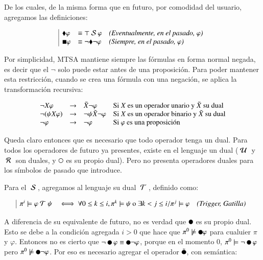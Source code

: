 De los cuales, de la misma forma que en futuro, por comodidad del usuario, agregamos las definiciones:

\[
	\begin{array}{|l l l}
		\blacklozenge \varphi & \equiv \top \text{ }\mathcal{S}\text{ } \varphi & \textit{(Eventualmente, en el pasado, $\varphi$)} \\
		\blacksquare \varphi & \equiv \neg \blacklozenge \neg \varphi & \textit{(Siempre, en el pasado, $\varphi$)} \\
	\end{array}
\]

Por simplicidad, MTSA mantiene siempre las fórmulas en forma normal negada, es decir que el $\neg$ solo puede estar antes de una proposición. Para poder mantener esta restricción, cuando se crea una fórmula con una negación, se aplica la transformación recursiva:

\[
	\begin{array}{l l l l}
	\neg X \varphi & \rightarrow & \tilde X \neg \varphi & \text{Si $X$ es un operador unario y $\tilde X$ su dual}\\
		\neg (\psi X \varphi) & \rightarrow & \neg \psi \tilde X \neg \varphi & \text{Si $X$ es un operador binario y $\tilde X$ su dual}\\
		\neg \varphi & \rightarrow & \neg \varphi & \text{Si $\varphi$ es una proposición} \\
	\end{array}
\]

Queda claro entonces que es necesario que todo operador tenga un dual. Para todos los operadores de futuro ya presentes, existe en el lenguaje un dual ($\text{ }\mathcal{U}\text{ }$ y $\text{ }\mathcal{R}\text{ }$ son duales, y $\next$ es su propio dual). Pero \citet{pnueli93} no presenta operadores duales para los símbolos de pasado que introduce.

Para el $\text{ }\mathcal{S}\text{ }$, agregamos al lenguaje su dual $\text{ }\mathcal{T}\text{ }$, definido como:

\[
	\begin{array}{|l l l}
		\pi^i \models \varphi \text{ }\mathcal{T}\text{ } \psi & \iff \forall 0 \leq k \leq i, \pi^k \models \psi \text{ o } \exists k < j \leq i / \pi^j \models \varphi & \textit{(Trigger, Gatilla)}
	\end{array}
\]

A diferencia de su equivalente de futuro, no es verdad que $\prev$ es su propio dual. Esto se debe a la condición agregada $i>0$ que hace que $\pi^0 \not \models \prev \varphi$ para cualuier $\pi$ y $\varphi$. Entonces no es cierto que $\neg \prev \varphi \equiv \prev \neg \varphi$, porque en el momento 0, $\pi^0 \models \neg \prev \varphi$ pero $\pi^0 \not \models \prev \neg \varphi$. Por eso es necesario agregar el operador $\weakprev$, con semántica:


